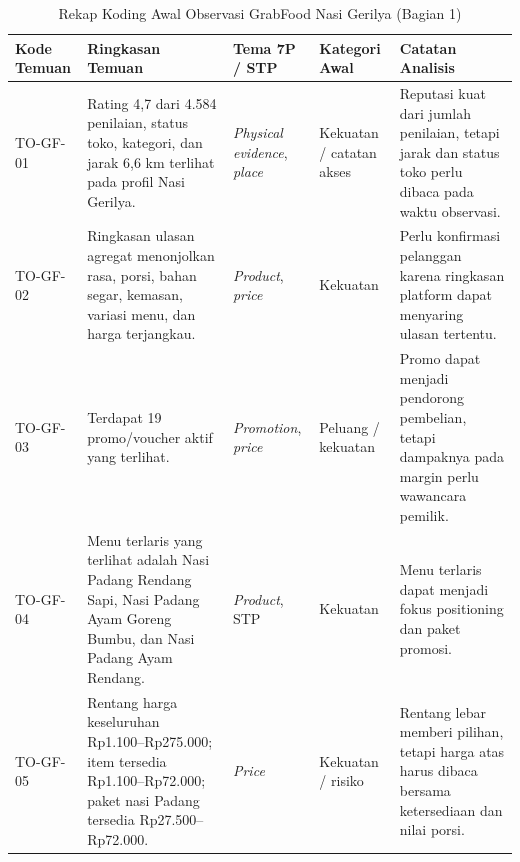 \begin{table}[!htbp]
    \centering
    \caption{Rekap Koding Awal Observasi GrabFood Nasi Gerilya (Bagian 1)}
    \label{tab:rekap-koding-awal-observasi-grabfood}
    \scriptsize
    \setlength{\tabcolsep}{3pt}
    \renewcommand{\arraystretch}{0.92}
    \begin{tabularx}{\textwidth}{|Z{1.6cm}|Y|Z{2.3cm}|Z{2.1cm}|Y|}
        \toprule
        \textbf{Kode Temuan} & \textbf{Ringkasan Temuan} & \textbf{Tema 7P / STP} & \textbf{Kategori Awal} & \textbf{Catatan Analisis} \\ \hline
        \midrule
        TO-GF-01 & Rating 4,7 dari 4.584 penilaian, status toko, kategori, dan jarak 6,6 km terlihat pada profil Nasi Gerilya. & \textit{Physical evidence}, \textit{place} & Kekuatan / catatan akses & Reputasi kuat dari jumlah penilaian, tetapi jarak dan status toko perlu dibaca pada waktu observasi. \\ \hline
        TO-GF-02 & Ringkasan ulasan agregat menonjolkan rasa, porsi, bahan segar, kemasan, variasi menu, dan harga terjangkau. & \textit{Product}, \textit{price} & Kekuatan & Perlu konfirmasi pelanggan karena ringkasan platform dapat menyaring ulasan tertentu. \\ \hline
        TO-GF-03 & Terdapat 19 promo/voucher aktif yang terlihat. & \textit{Promotion}, \textit{price} & Peluang / kekuatan & Promo dapat menjadi pendorong pembelian, tetapi dampaknya pada margin perlu wawancara pemilik. \\ \hline
        TO-GF-04 & Menu terlaris yang terlihat adalah Nasi Padang Rendang Sapi, Nasi Padang Ayam Goreng Bumbu, dan Nasi Padang Ayam Rendang. & \textit{Product}, STP & Kekuatan & Menu terlaris dapat menjadi fokus positioning dan paket promosi. \\ \hline
        TO-GF-05 & Rentang harga keseluruhan Rp1.100--Rp275.000; item tersedia Rp1.100--Rp72.000; paket nasi Padang tersedia Rp27.500--Rp72.000. & \textit{Price} & Kekuatan / risiko & Rentang lebar memberi pilihan, tetapi harga atas harus dibaca bersama ketersediaan dan nilai porsi. \\ \hline
        \bottomrule
    \end{tabularx}
\end{table}

